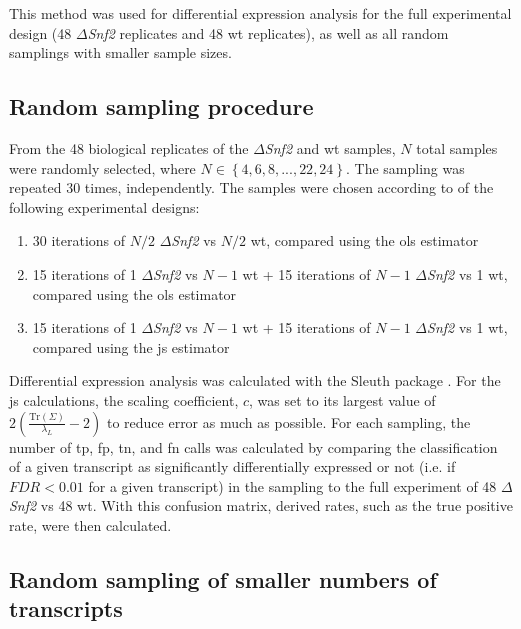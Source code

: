 This method was used for differential expression analysis for the full experimental design (48 $\Delta$\emph{Snf2} replicates and 48 \gls{wt} replicates), as well as all random samplings with smaller sample sizes.

\subsection{Random sampling procedure}

From the 48 biological replicates of the $\Delta$\emph{Snf2} and \gls{wt} samples, $N$ total samples were randomly selected, where $N \in \left\{4, 6, 8, ..., 22, 24 \right\}$.
The sampling was repeated 30 times, independently.
The samples were chosen according to of the following experimental designs:

\begin{enumerate}
  \item 30 iterations of $N/2$ $\Delta$\emph{Snf2} vs $N/2$ \gls{wt}, compared using the \gls{ols} estimator
  \item 15 iterations of 1 $\Delta$\emph{Snf2} vs $N - 1$ \gls{wt} + 15 iterations of $N - 1$ $\Delta$\emph{Snf2} vs 1 \gls{wt}, compared using the \gls{ols} estimator
  \item 15 iterations of 1 $\Delta$\emph{Snf2} vs $N - 1$ \gls{wt} + 15 iterations of $N - 1$ $\Delta$\emph{Snf2} vs 1 \gls{wt}, compared using the \gls{js} estimator
\end{enumerate}

Differential expression analysis was calculated with the Sleuth package \cite{pimentelDifferentialAnalysisRNAseq2017,yiGenelevelDifferentialAnalysis2018}.
For the \gls{js} calculations, the scaling coefficient, $c$, was set to its largest value of $2 \left( \frac{ \text{Tr} (\Sigma) }{\lambda_L} - 2 \right)$ to reduce error as much as possible.
For each sampling, the number of \gls{tp}, \gls{fp}, \gls{tn}, and \gls{fn} calls was calculated by comparing the classification of a given transcript as significantly differentially expressed or not (i.e. if $FDR < 0.01$ for a given transcript) in the sampling to the full experiment of 48 $\Delta$\emph{Snf2} vs 48 \gls{wt}.
With this confusion matrix, derived rates, such as the true positive rate, were then calculated.

\subsection{Random sampling of smaller numbers of transcripts}

